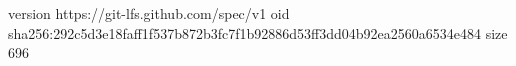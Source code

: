 version https://git-lfs.github.com/spec/v1
oid sha256:292c5d3e18faff1f537b872b3fc7f1b92886d53ff3dd04b92ea2560a6534e484
size 696
